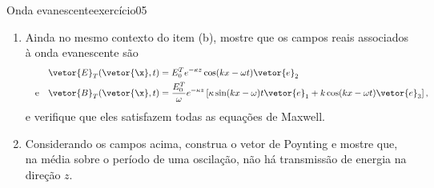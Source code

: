 \begin{exercício}{Onda evanescente}{exercício05}
\begin{enumerate}[label=(\alph*)]
        \item Ainda no mesmo contexto do item (b), mostre que os campos reais associados à onda evanescente são
            \begin{align*}
                \vetor{E}_T(\vetor{\x},t) &= E_0^T e^{- \kappa z} \cos(kx - \omega t) \vetor{e}_2\\
                \quad\text{e}\quad
                \vetor{B}_T(\vetor{\x},t) &=\frac{E_0^T}{\omega}e^{- \kappa z} \left[\kappa \sin(kx - \omega)t \vetor{e}_1 + k\cos(kx - \omega t) \vetor{e}_3\right],
            \end{align*}
            e verifique que eles satisfazem todas as equações de Maxwell.
        \item Considerando os campos acima, construa o vetor de Poynting e mostre que, na média sobre o período de uma oscilação, não há transmissão de energia na direção \(z\).
    \end{enumerate}
\end{exercício}
